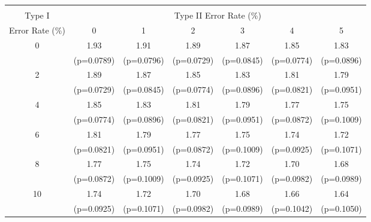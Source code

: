 \scriptsize{
\begin{tabular}{c|*{6}{c}}
\hline\hline \\[-8pt]
\rowcolor{yellow!15} Type I & \multicolumn{6}{c}{Type II Error Rate (\%)} \\
\rowcolor{yellow!15} Error Rate (\%)   & 0 & 1 & 2 & 3 & 4 & 5 \\ \hline
0 & 1.93 & 1.91 & 1.89 & 1.87 & 1.85 & 1.83 \\
 & (p=0.0789) & (p=0.0796) & (p=0.0729) & (p=0.0845) & (p=0.0774) & (p=0.0896) \\
[1em]
2 & 1.89 & 1.87 & 1.85 & 1.83 & 1.81 & 1.79 \\
 & (p=0.0729) & (p=0.0845) & (p=0.0774) & (p=0.0896) & (p=0.0821) & (p=0.0951) \\
[1em]
4 & 1.85 & 1.83 & 1.81 & 1.79 & 1.77 & 1.75 \\
 & (p=0.0774) & (p=0.0896) & (p=0.0821) & (p=0.0951) & (p=0.0872) & (p=0.1009) \\
[1em]
6 & 1.81 & 1.79 & 1.77 & 1.75 & 1.74 & 1.72 \\
 & (p=0.0821) & (p=0.0951) & (p=0.0872) & (p=0.1009) & (p=0.0925) & (p=0.1071) \\
[1em]
8 & 1.77 & 1.75 & 1.74 & 1.72 & 1.70 & 1.68 \\
 & (p=0.0872) & (p=0.1009) & (p=0.0925) & (p=0.1071) & (p=0.0982) & (p=0.0989) \\
[1em]
10 & 1.74 & 1.72 & 1.70 & 1.68 & 1.66 & 1.64 \\
 & (p=0.0925) & (p=0.1071) & (p=0.0982) & (p=0.0989) & (p=0.1042) & (p=0.1050) \\
\hline \hline
\end{tabular}
}